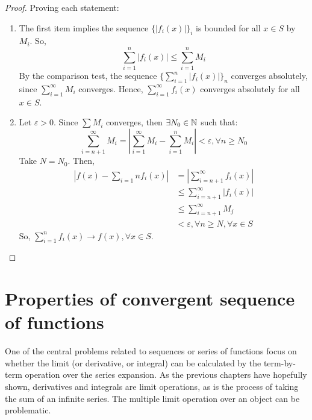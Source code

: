 \begin{proof}
    Proving each statement:
    \begin{enumerate}
        \item The first item implies the sequence $\{|f_i(x)|\}_i$ is bounded for all $x \in S$ by $M_i$. So,
            \begin{equation*}
                \sum \limits_{i=1}^n |f_i(x)| \leq \sum \limits_{i=1}^n M_i
            \end{equation*}
        By the comparison test, the sequence $\{\sum_{i=1}^n |f_i(x)|\}_n$ converges absolutely, since $\sum_{i=1}^\infty M_i$ converges. Hence, $\sum_{i=1}^\infty f_i(x)$ converges absolutely for all $ x \in S$.
        \item Let $\varepsilon > 0$. Since $\sum M_i$ converges, then $\exists N_0 \in \mathbb{N}$ such that:
            \begin{equation*}
                \sum \limits_{i = n+1}^\infty M_i = \left |
                    \sum \limits_{i = 1}^\infty M_i
                    - \sum \limits_{i = 1}^n M_i
                \right | < \varepsilon, \forall n \geq N_0
            \end{equation*}
            Take $N = N_0$. Then,
            \begin{align*}
                \left |
                    f(x) - \sum \limits_{i = 1}n f_i(x)
                \right |
                &= \left |
                    \sum \limits_{i = n+1}^\infty f_i(x)
                \right | \\
                &\leq \sum \limits_{i = n+1}^\infty |f_i(x)| \\
                &\leq \sum \limits_{i = n+1}^\infty M_j \\
                &< \varepsilon, \forall n \geq N, \forall x \in S
            \end{align*}
            So, $\sum_{i=1}^n f_i(x) \to f(x), \forall x \in S$.
    \end{enumerate}
\end{proof}

\section{Properties of convergent sequence of functions}

One of the central problems related to sequences or series of functions focus on whether the limit (or derivative, or integral) can be calculated by the term-by-term operation over the series expansion. As the previous chapters have hopefully shown, derivatives and integrals are limit operations, as is the process of taking the sum of an infinite series. The multiple limit operation over an object can be problematic.

